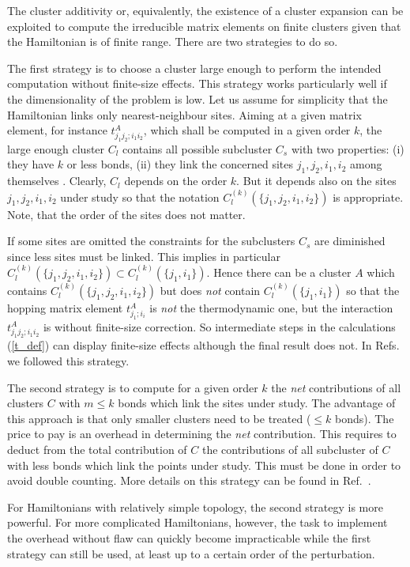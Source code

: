 The cluster additivity or, equivalently, the existence of a cluster
expansion can be exploited to compute the irreducible matrix elements
on finite clusters given that the Hamiltonian is of finite range.
There are two strategies to do so.

The first strategy is to choose a cluster large enough to perform
the intended computation without finite-size effects. This strategy
works particularly well if the dimensionality of the problem is low.
Let us assume
for simplicity that the Hamiltonian links only nearest-neighbour sites.
Aiming at a given matrix element, for instance $t^A_{j_1j_2;i_1i_2}$,
which shall be computed in a given order $k$, the large enough
cluster $C_l$ contains all possible subcluster $C_s$ with two properties:
(i) they  have $k$ or less bonds, (ii) they link the concerned sites
$j_1,j_2,i_1,i_2$ among themselves \cite{gnote}. Clearly, $C_l$ depends on the order
$k$. But it depends also on the sites $j_1,j_2,i_1,i_2$ under  study
so that the notation $C_l^{(k)}(\{j_1,j_2,i_1,i_2\})$ is appropriate.
Note, that the order of the sites does not matter.

If some sites are omitted the constraints for the subclusters $C_s$
are diminished since less sites must be linked. This implies
in particular
$C_l^{(k)}(\{j_1,j_2,i_1,i_2\}) \subset C_l^{(k)}(\{j_1,i_1\})$.
Hence there can be  a cluster $A$ which contains
$C_l^{(k)}(\{j_1,j_2,i_1,i_2\})$ but does {\it not} contain 
$C_l^{(k)}(\{j_1,i_1\})$ so that
the hopping matrix element $t^A_{j_1;i_i}$ is {\it not} the thermodynamic
one, but the interaction $t^A_{j_1j_2;i_1i_2}$ is without
finite-size correction. So intermediate steps in the calculations
(\ref{t_def}) can display finite-size effects although the
final result does not. In Refs.~\cite{uhrig98c,knett00b,knett00a,knett01b}
we followed this strategy.

The second strategy is to compute for a given order $k$
the {\it net} contributions of all clusters $C$ with $m\le k$ bonds
which link the sites under study. The advantage of this approach
is that only smaller clusters need to be treated ($\le k$ bonds).
The price to pay is an overhead in determining the {\it net}
contribution. This requires to deduct from the total contribution
of $C$ the contributions of all subcluster of $C$ with less bonds
which link the points under study. This must be done
in order to avoid double counting.
More details on this strategy can be found in Ref.~.

For Hamiltonians with relatively simple topology, the second strategy
is more powerful. For more complicated Hamiltonians, however, the task
to implement the overhead without flaw can quickly become impracticable
while the first strategy can still be used, at least up to a certain order
of the perturbation.



